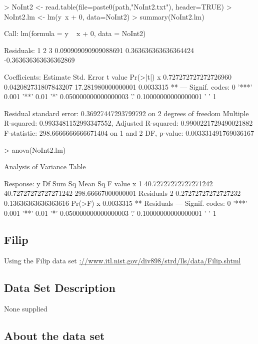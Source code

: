 \documentclass[10pt]{article}
\begin{document}
\begin{Schunk}
\begin{Sinput}
> NoInt2 <- read.table(file=paste0(path,"NoInt2.txt"), header=TRUE)
> NoInt2.lm <- lm(y~x + 0, data=NoInt2)
> summary(NoInt2.lm)
\end{Sinput}
\begin{Soutput}
Call:
lm(formula = y ~ x + 0, data = NoInt2)

Residuals:
                    1                     2                     3 
 0.090909090909088691  0.363636363636364424 -0.363636363636362869 

Coefficients:
              Estimate           Std. Error            t value  Pr(>|t|)   
x 0.727272727272726960 0.042082731807843207 17.281980000000001 0.0033315 **
---
Signif. codes:  
0 '***' 0.001 '**' 0.01 '*' 0.050000000000000003 '.' 0.10000000000000001 ' ' 1

Residual standard error: 0.36927447293799792 on 2 degrees of freedom
Multiple R-squared:  0.9933481152993347552,	Adjusted R-squared:  0.9900221729490021882 
F-statistic: 298.6666666666671404 on 1 and 2 DF,  p-value: 0.003331491769036167
\end{Soutput}
\begin{Sinput}
> anova(NoInt2.lm)
\end{Sinput}
\begin{Soutput}
Analysis of Variance Table

Response: y
          Df               Sum Sq              Mean Sq            F value
x          1 40.72727272727271242 40.72727272727271242 298.66667000000001
Residuals  2  0.27272727272727232  0.13636363636363616                   
             Pr(>F)   
x         0.0033315 **
Residuals             
---
Signif. codes:  
0 '***' 0.001 '**' 0.01 '*' 0.050000000000000003 '.' 0.10000000000000001 ' ' 1
\end{Soutput}
\end{Schunk}


\subsection{Filip}
Using the Filip data set \url{://www.itl.nist.gov/div898/strd/lls/data/Filip.shtml}

\subsection*{Data Set Description}
None supplied


\subsection*{About the data set}
\end{document}

